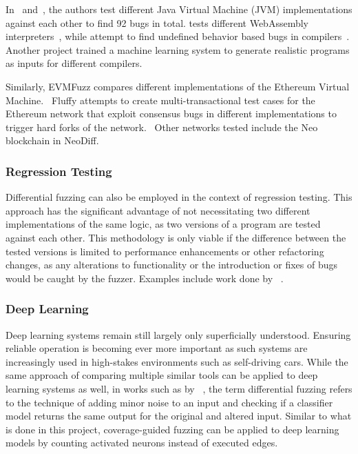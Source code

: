 \documentclass{article}
\let\savedCite=\cite
\renewcommand{\cite}{\unskip~\savedCite}
\begin{document}
\begin{multicols}{2}
    In\cite{JVM} and\cite{JVM2}, the authors test different Java Virtual Machine (JVM) implementations against each other to find 92 bugs in total. \citeauthor{WASM} tests different WebAssembly interpreters\cite{WASM}, while \citeauthor{UndefinedBehavior} attempt to find undefined behavior based bugs in compilers\cite{UndefinedBehavior}. Another project trained a machine learning system to generate realistic programs as inputs for different compilers.\cite{CompilerDL}

    Similarly, EVMFuzz compares different implementations of the Ethereum Virtual Machine.\cite{EVMFuzz} Fluffy attempts to create multi-transactional test cases for the Ethereum network that exploit consensus bugs in different implementations to trigger hard forks of the network.\cite{Fluffy} Other networks tested include the Neo blockchain in NeoDiff.\cite{NeoDiff}

    \subsubsection{Regression Testing}

    Differential fuzzing can also be employed in the context of regression testing. This approach has the significant advantage of not necessitating two different implementations of the same logic, as two versions of a program are tested against each other. This methodology is only viable if the difference between the tested versions is limited to performance enhancements or other refactoring changes, as any alterations to functionality or the introduction or fixes of bugs would be caught by the fuzzer. Examples include work done by \citeauthor{HyDiff}\cite{HyDiff}.

    \subsubsection{Deep Learning}

    Deep learning systems remain still largely only superficially understood. Ensuring reliable operation is becoming ever more important as such systems are increasingly used in high-stakes environments such as self-driving cars. While the same approach of comparing multiple similar tools can be applied to deep learning systems as well, in works such as by \citeauthor{DLFuzz}\cite{DLFuzz}, the term differential fuzzing refers to the technique of adding minor noise to an input and checking if a classifier model returns the same output for the original and altered input. Similar to what is done in this project, coverage-guided fuzzing can be applied to deep learning models by counting activated neurons instead of executed edges.


\end{multicols}
\end{document}
